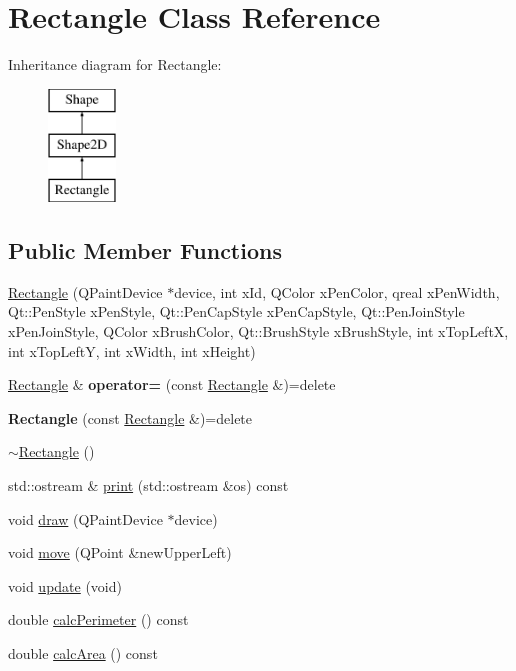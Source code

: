 \hypertarget{classRectangle}{\section{Rectangle Class Reference}
\label{classRectangle}
}
Inheritance diagram for Rectangle\-:\begin{figure}[H]
\begin{center}
\leavevmode
\includegraphics[height=3.000000cm]{classRectangle}
\end{center}
\end{figure}
\subsection*{Public Member Functions}
\begin{DoxyCompactItemize}
\item 
\hyperlink{classRectangle_a6e0872acf1be9c941846e9b2548e04af}{Rectangle} (Q\-Paint\-Device $\ast$device, int x\-Id, Q\-Color x\-Pen\-Color, qreal x\-Pen\-Width, Qt\-::\-Pen\-Style x\-Pen\-Style, Qt\-::\-Pen\-Cap\-Style x\-Pen\-Cap\-Style, Qt\-::\-Pen\-Join\-Style x\-Pen\-Join\-Style, Q\-Color x\-Brush\-Color, Qt\-::\-Brush\-Style x\-Brush\-Style, int x\-Top\-Left\-X, int x\-Top\-Left\-Y, int x\-Width, int x\-Height)
\item 
\hypertarget{classRectangle_a493870acad785dd377201c06c28003e4}{\hyperlink{classRectangle}{Rectangle} \& {\bfseries operator=} (const \hyperlink{classRectangle}{Rectangle} \&)=delete}\label{classRectangle_a493870acad785dd377201c06c28003e4}

\item 
\hypertarget{classRectangle_aee647897178612d4e18b9496bed0b58d}{{\bfseries Rectangle} (const \hyperlink{classRectangle}{Rectangle} \&)=delete}\label{classRectangle_aee647897178612d4e18b9496bed0b58d}

\item 
\hyperlink{classRectangle_a494c076b13aadf26efdce07d23c61ddd}{$\sim$\-Rectangle} ()
\item 
std\-::ostream \& \hyperlink{classRectangle_a06528cd92243f56f5eca551c5d637657}{print} (std\-::ostream \&os) const 
\item 
void \hyperlink{classRectangle_acd4e738aca00c23c0f1b15d77fec5dd8}{draw} (Q\-Paint\-Device $\ast$device)
\item 
void \hyperlink{classRectangle_a1fbeb44ec8b9400a5bfa7c0124fb29ee}{move} (Q\-Point \&new\-Upper\-Left)
\item 
void \hyperlink{classRectangle_a1679d95f9c3f0794a9fc54ca26509b6f}{update} (void)
\item 
double \hyperlink{classRectangle_af839a919dea3752e1d3dfad0282d19a1}{calc\-Perimeter} () const 
\item 
double \hyperlink{classRectangle_afa0bed5922c9517f5f771ed821f8623b}{calc\-Area} () const 
\end{DoxyCompactItemize}
